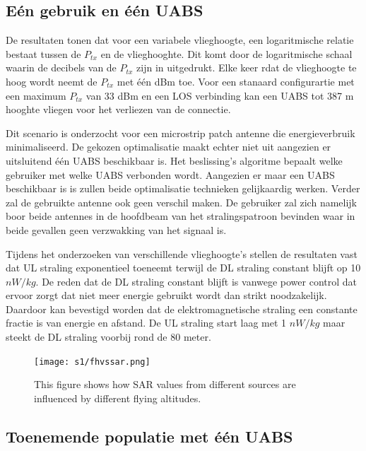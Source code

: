\documentclass[twocolumn]{phdsymp} %
\begin{document}
\subsection{E\'en gebruik en \'e\'en \gls{UABS}}
De resultaten tonen dat voor een variabele vlieghoogte, een logaritmische relatie bestaat tussen de 
 $P_{tx}$ en de vlieghooghte.
 Dit komt door de logaritmische schaal waarin de decibels van de $P_{tx}$ zijn in uitgedrukt.
Elke keer rdat de vlieghoogte te hoog wordt neemt de $P_{tx}$ met \'e\'en dBm toe.
Voor een stanaard configurartie met een maximum $P_{tx}$ van 33 dBm en een \gls{LOS} verbinding kan een 
\gls{UABS} tot 387 m hooghte vliegen voor het verliezen van de connectie.

Dit scenario is onderzocht voor een microstrip patch antenne die energieverbruik minimaliseerd.
De gekozen optimalisatie maakt echter niet uit aangezien er uitsluitend \'e\'en \gls{UABS} beschikbaar is.
Het beslissing's algoritme bepaalt welke gebruiker met welke \gls{UABS} verbonden wordt.
Aangezien er maar een \gls{UABS} beschikbaar is is zullen beide optimalisatie technieken gelijkaardig werken.
Verder zal de gebruikte antenne ook geen verschil maken. 
De gebruiker zal zich namelijk boor beide antennes in de hoofdbeam van het stralingspatroon 
bevinden waar in beide gevallen geen verzwakking van het signaal is.




Tijdens het onderzoeken van verschillende vlieghoogte's stellen de resultaten vast  dat
\gls{UL} straling exponentieel toeneemt terwijl de \gls{DL} straling constant blijft op 
10 $nW/kg$. De reden dat de \gls{DL} straling constant blijft is vanwege power control dat ervoor zorgt
dat niet meer energie gebruikt wordt dan strikt noodzakelijk. 
Daardoor kan bevestigd worden dat de elektromagnetische straling een constante fractie is van energie en afstand.
De \gls{UL} straling start laag met 1 $nW/kg$ maar steekt de \gls{DL} straling voorbij rond de 80 meter.

\begin{figure}[]
\centering
  \texttt{[image: s1/fhvssar.png]}
  \caption{This figure shows how SAR values from different sources are influenced by different flying altitudes.}
  \label{fig:s1_fhsar}
\end{figure}

\subsection{Toenemende populatie met \'e\'en UABS}
\end{document}
